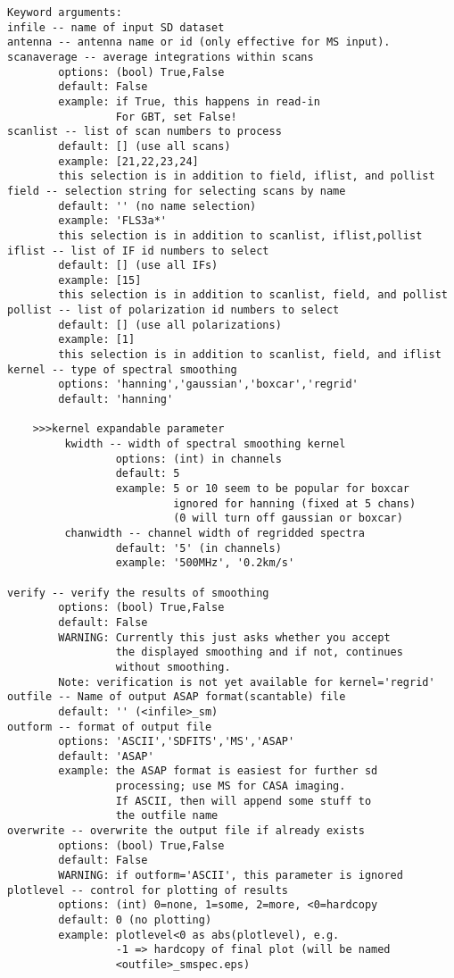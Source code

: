 \begin{verbatim}
Keyword arguments:
infile -- name of input SD dataset
antenna -- antenna name or id (only effective for MS input). 
scanaverage -- average integrations within scans
        options: (bool) True,False
        default: False
        example: if True, this happens in read-in
                 For GBT, set False!
scanlist -- list of scan numbers to process
        default: [] (use all scans)
        example: [21,22,23,24]
        this selection is in addition to field, iflist, and pollist
field -- selection string for selecting scans by name
        default: '' (no name selection)
        example: 'FLS3a*'
        this selection is in addition to scanlist, iflist,pollist
iflist -- list of IF id numbers to select
        default: [] (use all IFs)
        example: [15]
        this selection is in addition to scanlist, field, and pollist
pollist -- list of polarization id numbers to select
        default: [] (use all polarizations)
        example: [1]
        this selection is in addition to scanlist, field, and iflist
kernel -- type of spectral smoothing
        options: 'hanning','gaussian','boxcar','regrid'
        default: 'hanning'

    >>>kernel expandable parameter
         kwidth -- width of spectral smoothing kernel
                 options: (int) in channels 
                 default: 5
                 example: 5 or 10 seem to be popular for boxcar
                          ignored for hanning (fixed at 5 chans)
                          (0 will turn off gaussian or boxcar)
         chanwidth -- channel width of regridded spectra
                 default: '5' (in channels)
                 example: '500MHz', '0.2km/s'

verify -- verify the results of smoothing
        options: (bool) True,False
        default: False
        WARNING: Currently this just asks whether you accept
                 the displayed smoothing and if not, continues
                 without smoothing.
        Note: verification is not yet available for kernel='regrid'
outfile -- Name of output ASAP format(scantable) file
        default: '' (<infile>_sm)
outform -- format of output file
        options: 'ASCII','SDFITS','MS','ASAP'
        default: 'ASAP'
        example: the ASAP format is easiest for further sd
                 processing; use MS for CASA imaging.
                 If ASCII, then will append some stuff to
                 the outfile name
overwrite -- overwrite the output file if already exists
        options: (bool) True,False
        default: False
        WARNING: if outform='ASCII', this parameter is ignored
plotlevel -- control for plotting of results
        options: (int) 0=none, 1=some, 2=more, <0=hardcopy
        default: 0 (no plotting)
        example: plotlevel<0 as abs(plotlevel), e.g.
                 -1 => hardcopy of final plot (will be named
                 <outfile>_smspec.eps)
\end{verbatim}

